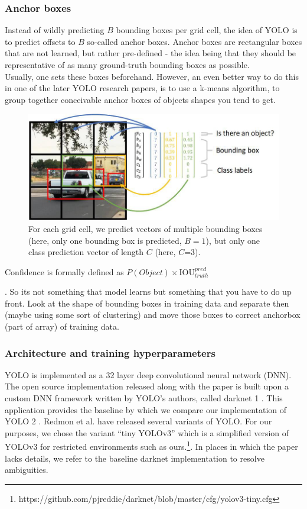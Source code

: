 \documentclass[a4paper]{article}
\begin{document}
\subsubsection*{Anchor boxes}
Instead of wildly predicting $B$ bounding boxes per grid cell, the idea of YOLO is to predict offsets to $B$ so-called anchor boxes. Anchor boxes are rectangular boxes that are not learned, but rather pre-defined - the idea being that they should be representative of as many ground-truth bounding boxes as possible. \\
Usually, one sets these boxes beforehand. However, an even better way to do this in one of the later YOLO research papers, is to use a k-means algorithm, to group together conceivable anchor boxes of objects shapes you tend to get. 
\begin{figure}
\includegraphics[scale=0.35]{yolo_mechanics}
\caption{For each grid cell, we predict vectors of multiple bounding boxes (here, only one bounding box is predicted, $B=1$), but only one class prediction vector of length $C$ (here, $C$=3).}

\end{figure}
Confidence is formally defined as $P(Object) \times \text{IOU}^{pred}_{truth}$

. So its not something that model learns but something that you have to do up front. Look at the shape of bounding boxes in training data and separate then (maybe using some sort of clustering) and move those boxes to correct anchorbox (part of array) of training data.

\subsubsection*{Architecture and training hyperparameters}
YOLO is implemented as a 32 layer deep convolutional
neural network (DNN). The open source implementation released
along with the paper is built upon a custom DNN
framework written by YOLO’s authors, called darknet 1
.
This application provides the baseline by which we compare
our implementation of YOLO 2
. Redmon et al. have
released several variants of YOLO. For our purposes, we
chose the variant ``tiny YOLOv3'' which is a simplified version of YOLOv3 for restricted environments such as ours.\footnote{https://github.com/pjreddie/darknet/blob/master/cfg/yolov3-tiny.cfg}. In places in which the paper lacks details, we refer to the baseline darknet implementation
to resolve ambiguities.
\end{document}
